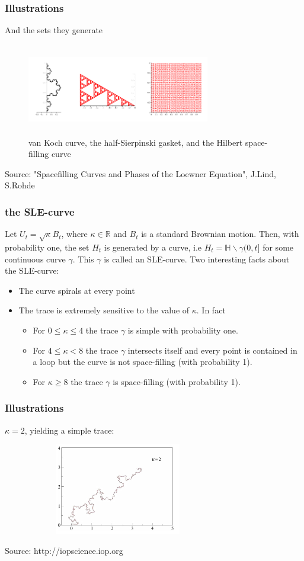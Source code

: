 \documentclass[10pt, compress]{beamer}
\begin{document}
\begin{frame}[fragile]
  \frametitle{Illustrations}
And the sets they generate
\begin{figure}
  \centering
 \includegraphics[width=8cm,height=4cm]{intro1.png}
 \caption{van Koch curve, the half-Sierpinski gasket, and the Hilbert space-filling curve}
\end{figure}
\tiny
Source: "Spacefilling Curves and Phases of the Loewner Equation", J.Lind, S.Rohde
\normalsize
\end{frame}

\begin{frame}[fragile]
  \frametitle{the SLE-curve}
Let $U_{t}=\sqrt{\kappa}B_{t}$, where $\kappa \in \mathbb{R}$ and $B_{t}$ is a standard Brownian motion. Then, with probability one, the set $H_{t}$ is generated by a curve, i.e $H_{t}=\mathbb{H}\backslash \gamma(0,t]$ for some continuous curve $\gamma$. This $\gamma$ is called an SLE-curve. Two interesting facts about the SLE-curve:


\begin{itemize}
\item The curve spirals at every point
\item The trace is extremely sensitive to the value of $\kappa$. In fact 
\begin{itemize}
\item For $0 \leq \kappa \leq 4$ the trace $\gamma$ is simple with probability one.
\item For $4 \leq \kappa < 8$ the trace $\gamma$ intersects itself and every point is contained in a loop but the curve is not space-filling (with probability 1).
\item For $\kappa \geq 8$ the trace $\gamma$ is space-filling (with probability 1).
\end{itemize}
\end{itemize}

\end{frame}

\begin{frame}[fragile]
  \frametitle{Illustrations}
$\kappa=2$, yielding a simple trace:
\begin{figure}
  \centering
 \includegraphics[width=8cm,height=4cm]{simple.png}
\end{figure}
\small
Source: http://iopscience.iop.org
\normalsize
\end{frame}
\end{document}
